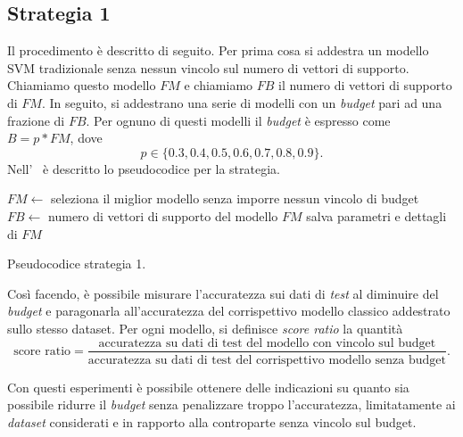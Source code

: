 \subsection{Strategia 1}
Il procedimento è descritto di seguito. Per prima cosa si addestra un modello SVM tradizionale senza nessun vincolo sul numero di vettori di supporto. Chiamiamo questo modello $FM$ e chiamiamo $FB$ il numero di vettori di supporto di $FM$.
In seguito, si addestrano una serie di modelli con un \emph{budget} pari ad una frazione di $FB$.
Per ognuno di questi modelli il \emph{budget} è espresso come $B=p*FM$, dove
\begin{equation*}
    p\in\{0.3, 0.4, 0.5, 0.6, 0.7, 0.8, 0.9\}.
\end{equation*}
Nell'~ è descritto lo pseudocodice per la strategia.
\begin{algorithm}
    \SetAlgoLined
    $FM \gets$ seleziona il miglior modello senza imporre nessun vincolo di budget\;
    $FB \gets$ numero di vettori di supporto del modello $FM$\;
    salva parametri e dettagli di $FM$\;
\caption{Pseudocodice strategia 1.}
\label{alg:esperimenti_1}
\end{algorithm}

Così facendo, è possibile misurare l'accuratezza sui dati di \emph{test} al diminuire del \emph{budget} e paragonarla all'accuratezza del corrispettivo modello classico addestrato sullo stesso dataset.
Per ogni modello, si definisce \emph{score ratio} la quantità
\begin{equation*}
    \text{score ratio} = \frac{\text{accuratezza su dati di test del modello con vincolo sul budget}}{\text{accuratezza su dati di test del corrispettivo modello senza budget}}.
\end{equation*}

Con questi esperimenti è possibile ottenere delle indicazioni su quanto sia possibile ridurre il \emph{budget} senza penalizzare troppo l'accuratezza, limitatamente ai \emph{dataset} considerati e in rapporto alla controparte senza vincolo sul budget.

